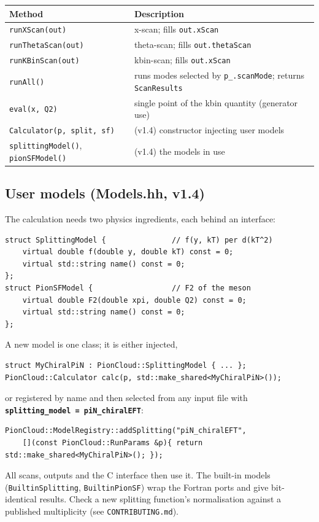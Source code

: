 \documentclass[11pt,a4paper]{article}
\newcommand{\code}[1]{\texttt{#1}}
\newcommand{\inikey}[1]{\texttt{\textbf{#1}}}
\begin{document}
\begin{center}
\begin{tabular}{lp{8cm}}
\toprule
\textbf{Method} & \textbf{Description} \\
\midrule
\code{runXScan(out)}     & x-scan; fills \code{out.xScan} \\
\code{runThetaScan(out)} & theta-scan; fills \code{out.thetaScan} \\
\code{runKBinScan(out)}  & kbin-scan; fills \code{out.xScan} \\
\code{runAll()}          & runs modes selected by \code{p\_.scanMode}; returns \code{ScanResults} \\
\code{eval(x, Q2)}       & single point of the kbin quantity (generator use) \\
\code{Calculator(p, split, sf)} & (v1.4) constructor injecting user models \\
\code{splittingModel()}, \code{pionSFModel()} & (v1.4) the models in use \\
\bottomrule
\end{tabular}
\end{center}

\subsection{User models (Models.hh, v1.4)}

The calculation needs two physics ingredients, each behind an interface:
\begin{lstlisting}[style=cppstyle]
struct SplittingModel {               // f(y, kT) per d(kT^2)
    virtual double f(double y, double kT) const = 0;
    virtual std::string name() const = 0;
};
struct PionSFModel {                  // F2 of the meson
    virtual double F2(double xpi, double Q2) const = 0;
    virtual std::string name() const = 0;
};
\end{lstlisting}
A new model is one class; it is either injected,
\begin{lstlisting}[style=cppstyle]
struct MyChiralPiN : PionCloud::SplittingModel { ... };
PionCloud::Calculator calc(p, std::make_shared<MyChiralPiN>());
\end{lstlisting}
or registered by name and then selected from any input file with
\inikey{splitting\_model = piN\_chiralEFT}:
\begin{lstlisting}[style=cppstyle]
PionCloud::ModelRegistry::addSplitting("piN_chiralEFT",
    [](const PionCloud::RunParams &p){ return std::make_shared<MyChiralPiN>(); });
\end{lstlisting}
All scans, outputs and the C interface then use it.  The built-in models
(\code{BuiltinSplitting}, \code{BuiltinPionSF}) wrap the Fortran ports and
give bit-identical results.  Check a new splitting function's normalisation
against a published multiplicity (see \texttt{CONTRIBUTING.md}).
\end{document}
